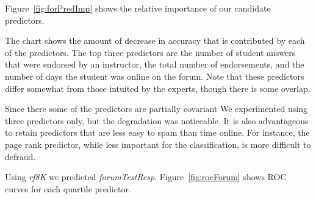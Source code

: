
Figure~\ref{fig:forPredImp} shows the relative importance of our
candidate predictors.

The chart shows the amount of decrease in accuracy that is contributed
by each of the predictors. The top three predictors are
the number of student answers that were endorsed by an instructor, the
total number of endorsements, and the number of days the student was online on the forum. Note that these predictors differ somewhat from those intuited
by the experts, though there is some overlap.

Since there some of the predictors are partially covariant We
experimented using three predictors only, but the degradation was
noticeable. It is also advantageous to retain predictors that are less
easy to spam than time online. For instance, the page rank predictor,
while less important for the classification, is more difficult to
defraud.

Using \emph{rf8K} we predicted
\emph{forumTestResp}. Figure~\ref{fig:rocForum} shows ROC curves for
each quartile predictor.

